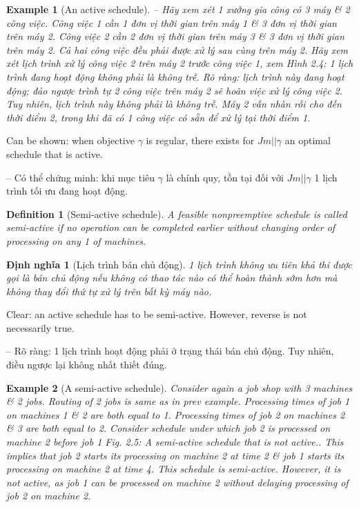 \documentclass{article}
\newtheorem{definition}{Definition}
\newtheorem{dinhnghia}{Định nghĩa}
\newtheorem{example}{Example}
\begin{document}
\begin{itemize}
\begin{itemize}
\begin{example}[An active schedule]
            -- Hãy xem xét 1 xưởng gia công có 3 máy \& 2 công việc. Công việc 1 cần 1 đơn vị thời gian trên máy 1 \& 3 đơn vị thời gian trên máy 2. Công việc 2 cần 2 đơn vị thời gian trên máy 3 \& 3 đơn vị thời gian trên máy 2. Cả hai công việc đều phải được xử lý sau cùng trên máy 2. Hãy xem xét lịch trình xử lý công việc 2 trên máy 2 trước công việc 1, xem {\sf Hình 2.4: 1 lịch trình đang hoạt động không phải là không trễ}. Rõ ràng: lịch trình này đang hoạt động; đảo ngược trình tự 2 công việc trên máy 2 sẽ hoãn việc xử lý công việc 2. Tuy nhiên, lịch trình này không phải là không trễ. Máy 2 vẫn nhàn rỗi cho đến thời điểm 2, trong khi đã có 1 công việc có sẵn để xử lý tại thời điểm 1.
        \end{example}
        Can be shown: when objective $\gamma$ is regular, there exists for $Jm||\gamma$ an optimal schedule that is active.

        -- Có thể chứng minh: khi mục tiêu $\gamma$ là chính quy, tồn tại đối với $Jm||\gamma$ 1 lịch trình tối ưu đang hoạt động.

        \begin{definition}[Semi-active schedule]
            A feasible nonpreemptive schedule is called {\rm semi-active} if no operation can be completed earlier without changing order of processing on any 1 of machines.
        \end{definition}

        \begin{dinhnghia}[Lịch trình bán chủ động]
            1 lịch trình không ưu tiên khả thi được gọi là {\rm bán chủ động} nếu không có thao tác nào có thể hoàn thành sớm hơn mà không thay đổi thứ tự xử lý trên bất kỳ máy nào.
        \end{dinhnghia}
        Clear: an active schedule has to be semi-active. However, reverse is not necessarily true.

        -- Rõ ràng: 1 lịch trình hoạt động phải ở trạng thái bán chủ động. Tuy nhiên, điều ngược lại không nhất thiết đúng.

        \begin{example}[A semi-active schedule]
            Consider again a job shop with 3 machines \& 2 jobs. Routing of 2 jobs is same as in prev example. Processing times of job 1 on machines 1 \& 2 are both equal to 1. Processing times of job 2 on machines 2 \& 3 are both equal to 2. Consider schedule under which job 2 is processed on machine 2 before job 1 {\sf Fig. 2.5: A semi-active schedule that is not active.}. This implies that job 2 starts its processing on machine 2 at time 2 \& job 1 starts its processing on machine 2 at time 4. This schedule is semi-active. However, it is not active, as job 1 can be processed on machine 2 without delaying processing of job 2 on machine 2.


\end{example}
\end{itemize}
\end{itemize}
\end{document}
